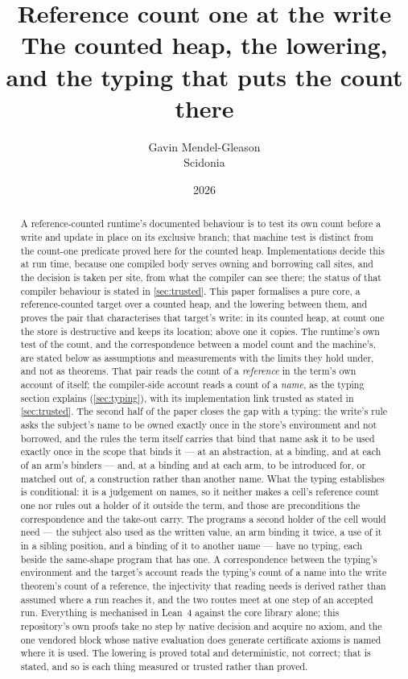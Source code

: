 \documentclass[11pt,a4paper]{article}
\title{Reference count one at the write\\[2pt]
\large The counted heap, the lowering, and the typing that puts the count there}
\author{Gavin Mendel-Gleason\\\small Scidonia}
\date{2026}
\theoremstyle{definition}
\theoremstyle{plain}
\begin{document}
\maketitle

\begin{abstract}
A reference-counted runtime's documented behaviour is to test its own count
before a write and update in place on its exclusive branch; that machine test is
distinct from the count-one predicate proved here for the counted heap.
Implementations decide this at run time, because one compiled body serves owning
and borrowing call sites, and the decision is taken per site, from what the
compiler can see there; the status of that compiler behaviour is stated in
\cref{sec:trusted}. This paper formalises a pure core, a reference-counted
target over a counted heap, and the lowering between them, and proves the pair
that characterises that target's write: in its counted heap, at count one the
store is destructive and keeps its location; above one it copies. The runtime's
own test of the count, and the correspondence between a model count and the
machine's, are stated below as assumptions and measurements with the limits they
hold under, and not as theorems. That pair reads the count of a \emph{reference}
in the term's own account of itself; the compiler-side account reads a count of
a \emph{name}, as the typing section explains (\cref{sec:typing}), with its
implementation link trusted as stated in \cref{sec:trusted}.
The second half of the paper closes the gap with a typing: the write's rule asks
the subject's name to be owned exactly once in the store's environment and not
borrowed, and the rules the term itself carries that bind that name ask it to be
used exactly once in the scope that binds it --- at an abstraction, at a binding,
and at each of an arm's binders --- and, at a binding and at each arm, to be
introduced for, or matched out of, a construction rather than another name. What
the typing establishes is conditional: it is a judgement on names, so it neither
makes a cell's reference count one nor rules out a holder of it outside the term,
and those are preconditions the correspondence and the take-out carry. The
programs a second holder of the cell would need --- the subject also used as the
written value, an arm binding it twice, a use of it in a sibling position, and a
binding of it to another name --- have no typing, each beside the same-shape
program that has one. A correspondence
between the typing's environment and the target's account reads the typing's
count of a name into the write theorem's count of a reference, the injectivity
that reading needs is derived rather than assumed where a run reaches it, and the
two routes meet at one step of an accepted run. Everything is mechanised in Lean~4
against the core library alone; this repository's own proofs take no step by
native decision and acquire no axiom, and the one vendored block whose native
evaluation does generate certificate axioms is named where it is used. The lowering
is proved total and deterministic, not correct; that is stated, and so is each
thing measured or trusted rather than proved.
\end{abstract}
\end{document}
